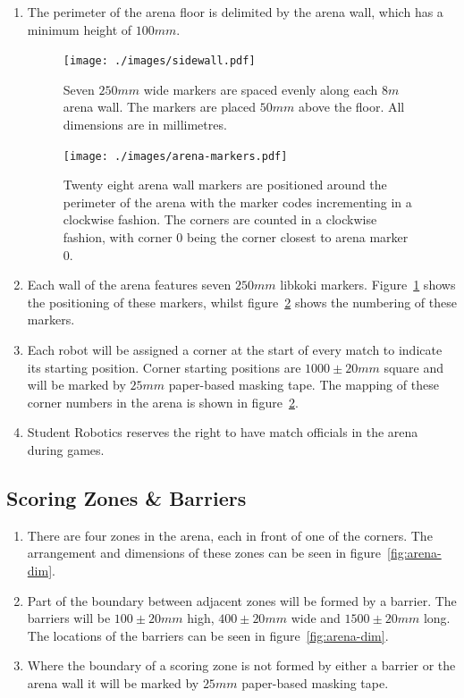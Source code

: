 \begin{enumerate}
\item The perimeter of the arena floor is delimited by the arena wall, which has a minimum height of $100mm$.

\begin{figure}
  \centering
  \texttt{[image: ./images/sidewall.pdf]}
  \caption{Seven $250mm$ wide markers are spaced evenly along each $8m$ arena wall.
           The markers are placed $50mm$ above the floor.
           All dimensions are in millimetres.}
  \label{fig:arena-wall}
\end{figure}

\begin{figure}
  \centering
  \texttt{[image: ./images/arena-markers.pdf]}
  \caption{Twenty eight arena wall markers are positioned around the perimeter of the arena with the marker codes incrementing in a clockwise fashion.
           The corners are counted in a clockwise fashion, with corner 0 being the corner closest to arena marker 0.}
  \label{fig:arena-zones}
\end{figure}

\item Each wall of the arena features seven $250mm$ libkoki markers.
      Figure~\ref{fig:arena-wall} shows the positioning of these markers, whilst figure~\ref{fig:arena-zones} shows the numbering of these markers.

\item Each robot will be assigned a corner at the start of every match to indicate its starting position.
      Corner starting positions are $1000 \pm 20mm$ square and will be marked by $25mm$ paper-based masking tape.
      The mapping of these corner numbers in the arena is shown in figure~\ref{fig:arena-zones}.

\item Student Robotics reserves the right to have match officials in the arena during games.

\end{enumerate}


\subsection{Scoring Zones \& Barriers}
\label{sub:Zones}

\begin{enumerate}
\item There are four zones in the arena, each in front of one of the corners.
      The arrangement and dimensions of these zones can be seen in figure~\ref{fig:arena-dim}.

\item Part of the boundary between adjacent zones will be formed by a barrier.
      The barriers will be $100 \pm 20mm$ high, $400 \pm 20mm$ wide and $1500 \pm 20mm$ long.
      The locations of the barriers can be seen in figure~\ref{fig:arena-dim}.

\item Where the boundary of a scoring zone is not formed by either a barrier or the arena wall
      it will be marked by $25mm$ paper-based masking tape.
\end{enumerate}

